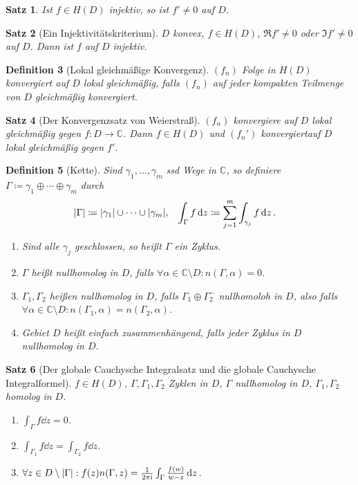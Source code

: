 \documentclass[a4paper]{article}
\newcounter{Sec}
\theoremstyle{marginbreak}
\newtheorem{definition}{Definition}[Sec]
\newtheorem{satz}[definition]{Satz}
\newcommand{\C}{\mathbb{C}}
\renewcommand{\i}{\mathrm{i}}
\begin{document}
	\begin{satz}
		Ist $f\in H(D)$ injektiv, so ist $f'\neq 0$ auf $D$.
	\end{satz}
	\begin{satz}[Ein Injektivitätskriterium]
		$D$ konvex, $f\in H(D)$, $\Re f'\neq 0$ oder $\Im f'\neq 0$ auf $D$. Dann ist $f$ auf $D$ injektiv.
	\end{satz}
	\begin{definition}[Lokal gleichmäßige Konvergenz]
		$(f_n)$ Folge in $H(D)$ konvergiert auf $D$ lokal gleichmäßig, falls $(f_n)$ auf
		jeder kompakten Teilmenge von $D$ gleichmäßig konvergiert.
	\end{definition}
	\begin{satz}[Der Konvergenzsatz von Weierstraß]
		$(f_n)$ konvergiere auf $D$ lokal gleichmäßig gegen $f\colon D\to\C$. Dann
		$f\in H(D)$ und $(f_n')$ konvergiertauf $D$ lokal gleichmäßig gegen $f'$.
	\end{satz}
	\begin{definition}[Kette]
		Sind $\gamma_1,\ldots,\gamma_m$ ssd Wege in $\C$, so definiere $\Gamma\coloneqq \gamma_1\oplus\cdots\oplus\gamma_m$
		durch
		\begin{align*}
			\abs{\Gamma}&\coloneqq \abs{\gamma_1}\cup\cdots\cup\abs{\gamma_m},
			& \int_\Gamma f\dd{z} &\coloneqq \sum_{j=1}^m\int_{\gamma_j}f\dd{z}.
		\end{align*}
		\begin{enumerate}[label=(\alph*)]
			\item Sind alle $\gamma_j$ geschlossen, so heißt $\Gamma$ ein Zyklus.
			\item $\Gamma$ heißt nullhomolog in $D$, falls $\forall \alpha\in \C\setminus D: n(\Gamma, \alpha) = 0$.
			\item $\Gamma_1, \Gamma_2$ heißen nullhomolog in $D$, falls $\Gamma_1\oplus\Gamma_2^-$ nullhomoloh in $D$,
				also falls $\forall \alpha\in\C\setminus D: n(\Gamma_1,\alpha)=n(\Gamma_2,\alpha)$.
			\item Gebiet $D$ heißt einfach zusammenhängend, falls jeder Zyklus in $D$ nullhomolog in $D$.
		\end{enumerate}
	\end{definition}
	\begin{satz}[Der globale Cauchysche Integralsatz und die globale Cauchysche Integralformel]
		$f\in H(D)$, $\Gamma, \Gamma_1, \Gamma_2$ Zyklen in $D$, $\Gamma$ nullhomolog in $D$, $\Gamma_1, \Gamma_2$ homolog in $D$.
		\begin{enumerate}[label=(\alph*)]
			\item $\int_\Gamma f\dd{z}=0$.
			\item $\int_{\Gamma_1} f\dd{z}=\int_{\Gamma_2}f\dd{z}$.
			\item $\forall z\in D\setminus\abs{\Gamma}:f(z)n(\Gamma, z) = \frac{1}{2\pi\i}\int_\Gamma\frac{f(w)}{w-z}\dd{z}$.
		\end{enumerate}
	\end{satz}
\end{document}
